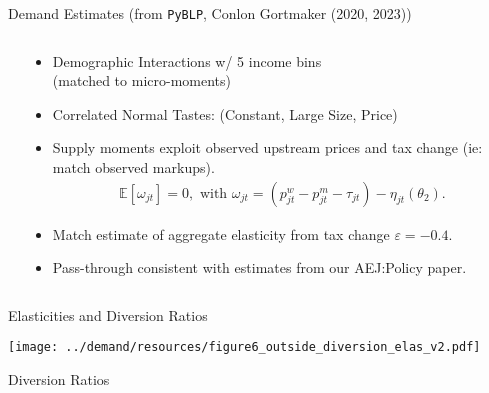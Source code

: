 \begin{frame}{Demand Estimates (from \texttt{PyBLP}, Conlon Gortmaker (2020, 2023))}
\begin{columns}[T]
 \hspace{-1.5cm}
 \begin{column}{.68\textwidth}
\vspace{-0.3cm}
    \begin{center}
    \scalebox{0.55}{
     
    }
    \end{center}
  \end{column}
  \hfill
 \hspace{-2.2cm}
\begin{column}{.55\textwidth}
  \begin{itemize}
    \item Demographic Interactions w/ 5 income bins \\ (matched to micro-moments)
    \item Correlated Normal Tastes: (Constant, Large Size, Price)
    \item Supply moments exploit observed upstream prices and tax change (ie: match observed markups).
    \vspace{-0.2cm}
    \begin{align*}
    \mathbb{E}[\omega_{jt}]=0, \text{ with }\omega_{jt} = \left(p^w_{jt}  - p^m_{jt}-\tau_{jt} \right) -\eta_{jt}\left(\theta_2\right).
    \end{align*}
   \vspace{-0.8cm}
    \item Match estimate of aggregate elasticity from tax change $\varepsilon=-0.4$.
    \item Pass-through consistent with estimates from our AEJ:Policy paper.
  \end{itemize}
\end{column}
\end{columns}
\end{frame}

\begin{frame}{Elasticities and Diversion Ratios}
\begin{center}
    \texttt{[image: ../demand/resources/figure6\_outside\_diversion\_elas\_v2.pdf]}
\end{center}
\end{frame}



\begin{frame}{Diversion Ratios}
\begin{center}
\scalebox{0.6}{
 
}
\end{center}
\end{frame}


